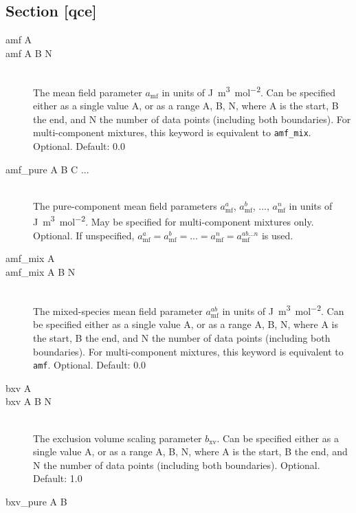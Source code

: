 \documentclass{scrartcl}
\newcommand{\amf}{a_\mathrm{mf}}
\newcommand{\bxv}{b_\mathrm{xv}}
\begin{document}
\subsection{Section [qce]}

\begin{description}
    \item[amf A]
    \item[amf A B N] \hfill \\
        The mean field parameter $\amf$ in units of \si{\joule\cubic\meter\per\mole\squared}.
        Can be specified either as a single value A, or as a range A, B, N, where A is the start, B the end, and N the number of data points (including both boundaries).
        For multi-component mixtures, this keyword is equivalent to \texttt{amf\_mix}.
        Optional. Default: 0.0
        \vspace{0.1cm}
    \item[amf\_pure A B C ...] \hfill \\
        The pure-component mean field parameters $\amf^{a}$, $\amf^{b}$, ..., $\amf^{n}$ in units of \si{\joule\cubic\meter\per\mole\squared}.
        May be specified for multi-component mixtures only.
        Optional. If unspecified, $\amf^a = \amf^b = ... = \amf^n = \amf^{ab...n}$ is used.
        \vspace{0.1cm}
    \item[amf\_mix A]
    \item[amf\_mix A B N] \hfill \\
        The mixed-species mean field parameter $\amf^{ab}$ in units of \si{\joule\cubic\meter\per\mole\squared}.
        Can be specified either as a single value A, or as a range A, B, N, where A is the start, B the end, and N the number of data points (including both boundaries).
        For multi-component mixtures, this keyword is equivalent to \texttt{amf}.
        Optional. Default: 0.0
        \vspace{0.1cm}
    \item[bxv A]
    \item[bxv A B N] \hfill \\
        The exclusion volume scaling parameter $\bxv$.
        Can be specified either as a single value A, or as a range A, B, N, where A is the start, B the end, and N the number of data points (including both boundaries).
        Optional. Default: 1.0
        \vspace{0.1cm}
    \item[bxv\_pure A B] \hfill \\

\end{description}
\end{document}
